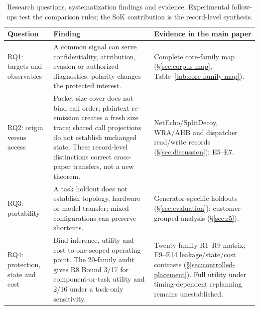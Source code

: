 \begin{table}[t]\centering\footnotesize
\caption{Research questions, systematization findings and evidence. Experimental follow-ups test the comparison rules; the SoK contribution is the record-level synthesis.}\label{tab:rq-findings}
\begin{tabularx}{\textwidth}{@{}p{}YY@{}}\toprule
Question & Finding & Evidence in the main paper\\\midrule
RQ1: targets and observables & A common signal can serve confidentiality, attribution, evasion or authorized diagnostics; polarity changes the protected interest. & Complete core-family map (\S\ref{sec:corpus-map}, Table~\ref{tab:core-family-map}).\\
RQ2: origin versus access & Packet-size cover does not bind call order; plaintext re-emission creates a fresh size trace; shared call projections do not establish unchanged state. These record-level distinctions correct cross-paper transfers, not a new theorem. & NetEcho/SplitDecoy, WRA/AHB and dispatcher read/write records (\S\ref{sec:discussion}); E5--E7.\\
RQ3: portability & A task holdout does not establish topology, hardware or model transfer; mixed configurations can preserve shortcuts. & Generator-specific holdouts (\S\ref{sec:evaluation}); customer-grouped analysis (\S\ref{sec:r5}).\\
RQ4: protection, state and cost & Bind inference, utility and cost to one scoped operating point. The 20-family audit gives R8 Bound 3/17 for component-or-task utility and 2/16 under a task-only sensitivity. & Twenty-family R1--R9 matrix; E9--E14 leakage/state/cost contrasts (\S\ref{sec:controlled-placement}). Full utility under timing-dependent replanning remains unestablished.\\\bottomrule
\end{tabularx}\end{table}
